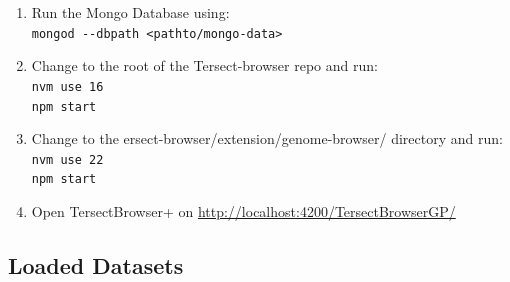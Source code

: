 \documentclass[12pt]{article}
\begin{document}
\begin{enumerate}
    \item Run the Mongo Database using: \\
        \verb+mongod --dbpath <pathto/mongo-data>+
    \item Change to the root of the Tersect-browser repo and run:\\
        \verb+nvm use 16+\\
        \verb+npm start+
    \item Change to the ersect-browser/extension/genome-browser/ directory and run:\\
        \verb+nvm use 22+\\
        \verb+npm start+
    \item Open TersectBrowser+ on \url{http://localhost:4200/TersectBrowserGP/}
\end{enumerate}

\subsection{Loaded Datasets}
\end{document}
